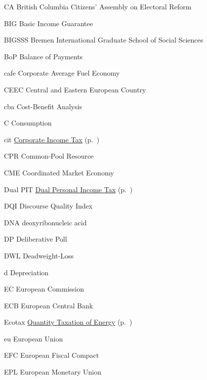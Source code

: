 	{CA}
	{British Columbia Citizens' Assembly on Electoral Reform}

	{BIG}
	{Basic Income Guarantee}

	{BIGSSS}
	{Bremen International Graduate School of Social Sciences}

	{BoP}
	{Balance of Payments}

	{cafe}
	{Corporate Average Fuel Economy}

	{CEEC}
	{Central and Eastern European Country}

	{cba}
	{Cost-Benefit Analysis}

	{C}
	{Consumption}

	{cit}
	{\hyperref[sec:CIT]{Corporate Income Tax} (p.~\pageref{sec:CIT})}

	{CPR}
	{Common-Pool Resource}

	{CME}
	{Coordinated Market Economy}

	{Dual PIT}
	{\hyperref[sec:Dual-PIT]{Dual Personal Income Tax} (p.~\pageref{sec:Dual-PIT})}

	{DQI}
	{Discourse Quality Index}

	{DNA}
	{deoxyribonucleic acid}

	{DP\textregistered}
	{Deliberative Poll \textregistered}

	{DWL}
	{Deadweight-Loss}

	{d}
	{Depreciation}

	{EC}
	{European Commission}

	{ECB}
	{European Central Bank}

	{Ecotax}
	{\hyperref[sec:Ecotax]{Quantity Taxation of Energy} (p.~\pageref{sec:Ecotax})}

	{eu}
	{European Union}

	{EFC}
	{European Fiscal Compact}

	{EPL}
	{European Monetary Union}

